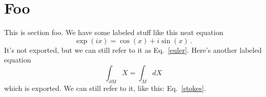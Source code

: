 \section{Foo}

This is section foo.
We have some labeled stuff like this neat equation
\begin{equation}
  \exp(i x) = \cos(x) + i \sin(x)  \label{euler}
  \, .
\end{equation}
It's not exported, but we can still refer to it as Eq.~\ref{euler}.
Here's another labeled equation
\begin{equation}
  \int_{\partial M} X = \int_M dX  \label{stokes}  %
\end{equation}
which is exported.
We can still refer to it, like this: Eq.~\ref{stokes}.



